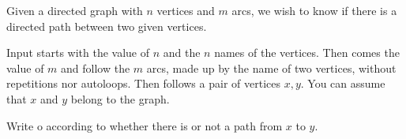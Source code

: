 

\Statement


Given a directed graph with $n$ vertices and $m$ arcs,
we wish to know if there is a directed path between two given vertices.


\Input



Input starts with the value of $n$ and the $n$ names of the vertices.
Then comes the value of $m$ and follow the $m$ arcs, made up by the name
of two vertices, without repetitions nor autoloops.
Then follows a pair of vertices $x,y$. You can assume that
$x$ and $y$ belong to the graph.


\Output



Write  o 
according to whether there is or not a path from $x$ to $y$.

\Sample

